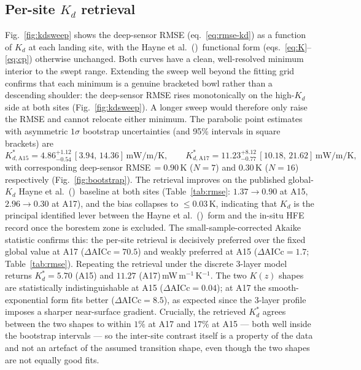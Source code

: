 \documentclass[11pt]{article}
\newcommand{\Hayne}{Hayne et al.\ (\citeyear{hayne2017})}
\begin{document}
\subsection{Per-site $K_d$ retrieval}\label{sec:results-kd}
Fig.~\ref{fig:kdsweep} shows the deep-sensor RMSE
(eq.~\ref{eq:rmse-kd}) as a function of $K_d$ at each landing site,
with the \Hayne\ functional form (eqs.~\ref{eq:K}--\ref{eq:cp})
otherwise unchanged. Both curves have a clean, well-resolved minimum
interior to the swept range. Extending the sweep well beyond the
fitting grid confirms that each minimum is a genuine bracketed bowl
rather than a descending shoulder: the deep-sensor RMSE rises
monotonically on the high-$K_d$ side at both sites
(Fig.~\ref{fig:kdsweep}). A longer sweep would therefore only
raise the RMSE and cannot relocate either minimum. The
parabolic point estimates with asymmetric $1\sigma$ bootstrap
uncertainties (and 95\% intervals in square brackets) are
\[
K_{d,\mathrm{A15}}^{*}=4.86^{+1.12}_{-0.54}\,[3.94,\,14.36]\,\si{\milli\watt\per\meter\per\kelvin},\qquad
K_{d,\mathrm{A17}}^{*}=11.23^{+8.12}_{-0.77}\,[10.18,\,21.62]\,\si{\milli\watt\per\meter\per\kelvin},
\]
with corresponding deep-sensor RMSE\,$=0.90$\,K ($N=7$) and
$0.30$\,K ($N=16$) respectively (Fig.~\ref{fig:bootstrap}). The
retrieval improves on the published global-$K_d$ \Hayne\ baseline at
both sites (Table~\ref{tab:rmse}: $1.37\to 0.90$ at A15,
$2.96\to 0.30$ at A17), and the bias collapses to $\le 0.03$\,K,
indicating that $K_d$ is the principal identified lever between the
\Hayne\ form and the in-situ HFE record once the borestem zone is
excluded. The small-sample-corrected Akaike statistic confirms this:
the per-site retrieval is decisively preferred over the fixed global
value at A17 ($\Delta\mathrm{AICc}=70.5$) and weakly preferred at A15
($\Delta\mathrm{AICc}=1.7$; Table~\ref{tab:rmse}). Repeating the
retrieval under the discrete 3-layer model returns
$K_d^{*}=5.70$ (A15) and $11.27$ (A17)\,mW\,m$^{-1}$\,K$^{-1}$. The two
$K(z)$ shapes are statistically indistinguishable at A15
($\Delta\mathrm{AICc}=0.04$); at A17 the smooth-exponential form fits
better ($\Delta\mathrm{AICc}=8.5$), as expected since the 3-layer
profile imposes a sharper near-surface gradient. Crucially, the
retrieved $K_d^{*}$ agrees between the two shapes to within
$1\%$ at A17 and $17\%$ at A15 --- both well inside the bootstrap
intervals --- so the inter-site contrast itself is a property of the
data and not an artefact of the assumed transition shape, even though
the two shapes are not equally good fits.
\end{document}
